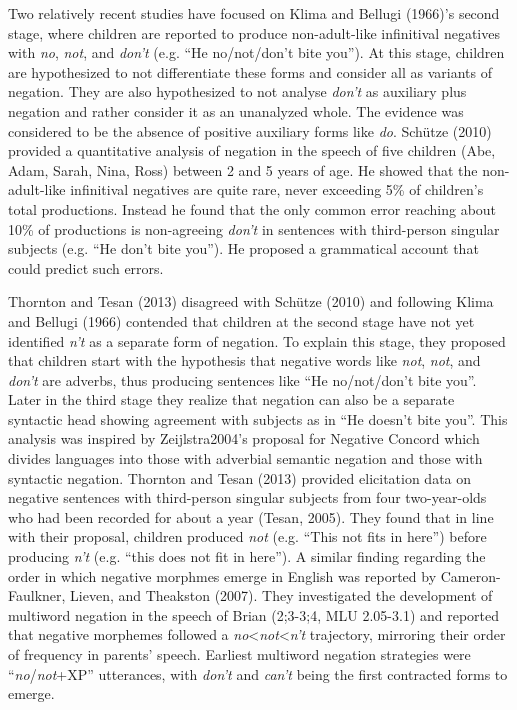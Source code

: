 \documentclass[man,floatsintext,draftall]{apa6}
\begin{document}
Two relatively recent studies have focused on Klima and Bellugi (1966)'s second stage, where children are reported to produce non-adult-like infinitival negatives with \emph{no}, \emph{not}, and \emph{don't} (e.g. \enquote{He no/not/don't bite you}). At this stage, children are hypothesized to not differentiate these forms and consider all as variants of negation. They are also hypothesized to not analyse \emph{don't} as auxiliary plus negation and rather consider it as an unanalyzed whole. The evidence was considered to be the absence of positive auxiliary forms like \emph{do}. Schütze (2010) provided a quantitative analysis of negation in the speech of five children (Abe, Adam, Sarah, Nina, Ross) between 2 and 5 years of age. He showed that the non-adult-like infinitival negatives are quite rare, never exceeding 5\% of children's total productions. Instead he found that the only common error reaching about 10\% of productions is non-agreeing \emph{don't} in sentences with third-person singular subjects (e.g. \enquote{He don't bite you}). He proposed a grammatical account that could predict such errors.

Thornton and Tesan (2013) disagreed with Schütze (2010) and following Klima and Bellugi (1966) contended that children at the second stage have not yet identified \emph{n't} as a separate form of negation. To explain this stage, they proposed that children start with the hypothesis that negative words like \emph{not}, \emph{not}, and \emph{don't} are adverbs, thus producing sentences like \enquote{He no/not/don't bite you}. Later in the third stage they realize that negation can also be a separate syntactic head showing agreement with subjects as in \enquote{He doesn't bite you}. This analysis was inspired by Zeijlstra2004's proposal for Negative Concord which divides languages into those with adverbial semantic negation and those with syntactic negation. Thornton and Tesan (2013) provided elicitation data on negative sentences with third-person singular subjects from four two-year-olds who had been recorded for about a year (Tesan, 2005). They found that in line with their proposal, children produced \emph{not} (e.g. \enquote{This not fits in here}) before producing \emph{n't} (e.g. \enquote{this does not fit in here}). A similar finding regarding the order in which negative morphmes emerge in English was reported by Cameron-Faulkner, Lieven, and Theakston (2007). They investigated the development of multiword negation in the speech of Brian (2;3-3;4, MLU 2.05-3.1) and reported that negative morphemes followed a \emph{no}\textless{}\emph{not}\textless{}\emph{n't} trajectory, mirroring their order of frequency in parents' speech. Earliest multiword negation strategies were \enquote{\emph{no}/\emph{not}+XP} utterances, with \emph{don't} and \emph{can't} being the first contracted forms to emerge.
\end{document}
